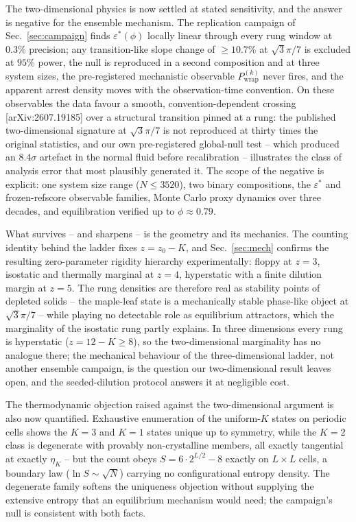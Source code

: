 \documentclass[aps,prl,twocolumn,superscriptaddress,floatfix]{revtex4-2}
\begin{document}
The two-dimensional physics is now settled at stated sensitivity, and the
answer is negative for the ensemble mechanism. The replication campaign of
Sec.~\ref{sec:campaign} finds $\varepsilon^*(\phi)$ locally linear through
every rung window at $0.3\%$ precision; any transition-like slope change of
$\geq10.7\%$ at $\sqrt{3}\pi/7$ is excluded at $95\%$ power, the null is
reproduced in a second composition and at three system sizes, the
pre-registered mechanistic observable $P^{(k)}_{\mathrm{wrap}}$ never fires,
and the apparent arrest density moves with the observation-time convention.
On these observables the data favour a smooth, convention-dependent crossing
[arXiv:2607.19185] over a structural transition pinned at a rung: the
published two-dimensional signature at $\sqrt{3}\pi/7$ is not reproduced at
thirty times the original statistics, and our own pre-registered global-null
test -- which produced an $8.4\sigma$ artefact in the normal fluid before
recalibration -- illustrates the class of analysis error that most plausibly
generated it. The scope of the negative is explicit: one system size range
($N\leq3520$), two binary compositions, the $\varepsilon^*$ and
frozen-refscore observable families, Monte Carlo proxy dynamics over three
decades, and equilibration verified up to $\phi\approx0.79$.

What survives -- and sharpens -- is the geometry and its mechanics. The
counting identity behind the ladder fixes $z=z_0-K$, and
Sec.~\ref{sec:mech} confirms the resulting zero-parameter rigidity
hierarchy experimentally: floppy at $z=3$, isostatic and thermally marginal
at $z=4$, hyperstatic with a finite dilution margin at $z=5$. The rung
densities are therefore real as stability points of depleted solids -- the
maple-leaf state is a mechanically stable phase-like object at
$\sqrt{3}\pi/7$ -- while playing no detectable role as equilibrium
attractors, which the marginality of the isostatic rung partly explains. In
three dimensions every rung is hyperstatic ($z=12-K\geq8$), so the
two-dimensional marginality has no analogue there; the mechanical behaviour
of the three-dimensional ladder, not another ensemble campaign, is the
question our two-dimensional result leaves open, and the seeded-dilution
protocol answers it at negligible cost.

The thermodynamic objection raised against the two-dimensional argument is
also now quantified. Exhaustive enumeration of the uniform-$K$ states on
periodic cells shows the $K{=}3$ and $K{=}1$ states unique up to symmetry,
while the $K{=}2$ class is degenerate with provably non-crystalline members,
all exactly tangential at exactly $\eta_K$ -- but the count obeys
$S=6\cdot2^{L/2}-8$ exactly on $L\times L$ cells, a boundary law
($\ln S\sim\sqrt{N}$) carrying no configurational entropy density. The
degenerate family softens the uniqueness objection without supplying the
extensive entropy that an equilibrium mechanism would need; the campaign's
null is consistent with both facts.
\end{document}
